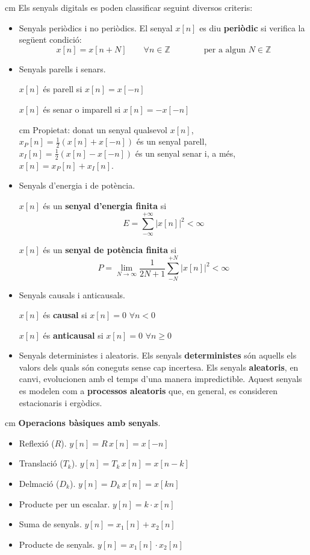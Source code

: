 \documentclass{article}
\newcommand\Z{\mathbb{Z}}
\begin{document}
 cm
\noindent
Els senyals digitals es poden classificar seguint diversos
criteris:
\begin{itemize}
\item Senyals peri\`odics i no peri\`odics. El senyal $x[n]$ es diu \textbf{peri\`odic}
si verifica la seg\"uent condici\'o:
\[
x[n]=x[n+N] \qquad \forall n \in \Z \qquad \qquad \text{per a algun $N \in \Z$} 
\]
\item Senyals parells i senars.

\noindent
$x[n]$ \'es parell si $x[n]=x[-n]$

\noindent
$x[n]$ \'es senar o imparell si $x[n]=-x[-n]$

 cm
\noindent
Propietat: donat un senyal qualsevol $x[n]$, $x_P[n]=\frac{1}{2} (x[n]+x[-n])$ \'es
un senyal parell, $x_I[n]=\frac{1}{2} (x[n]-x[-n])$ \'es un senyal senar i, a m\'es,
$x[n]=x_P[n]+x_I[n]$.

\item Senyals d'energia i de pot\`encia.

\noindent
$x[n]$ \'es un \textbf{senyal d'energia finita} si 
\[
E=\sum_{-\infty}^{+\infty} |x[n]|^2 < \infty
\]

\noindent
$x[n]$ \'es un \textbf{senyal de pot\`encia finita} si 
\[
P=\lim_{N \rightarrow \infty} \frac{1}{2N+1} \sum_{-N}^{+N} |x[n]|^2 < \infty
\]

\item Senyals causals i anticausals.

\noindent
$x[n]$ \'es \textbf{causal} si $x[n]=0$ $\forall n < 0$

\noindent
$x[n]$ \'es \textbf{anticausal} si $x[n]=0$ $\forall n \geq 0$


\item Senyals deterministes i aleatoris. Els senyals \textbf{deterministes} s\'on aquells
els valors dels quals s\'on coneguts sense cap incertesa. 
Els senyals \textbf{aleatoris}, en canvi, evolucionen amb el temps d'una manera
impredictible. Aquest senyals es modelen com a \textbf{processos aleatoris}
que, en general, es consideren estacionaris i erg\`odics.
\end{itemize}


 cm
\noindent
\textbf{Operacions b\`asiques amb senyals}.
\begin{itemize}
\item Reflexi\'o ($R$). $y[n]=R \, x[n] = x[-n]$ 

\item Translaci\'o ($T_k$). $y[n]=T_k \, x[n] = x[n-k]$

\item Delmaci\'o ($D_k$). $y[n]=D_k \, x[n]=x[k n]$

\item Producte per un escalar. $y[n]=k \cdot x[n]$

\item Suma de senyals. $y[n]=x_1[n] + x_2[n]$

\item Producte de senyals. $y[n]=x_1[n] \cdot x_2[n]$
 
\end{itemize}
\end{document}
